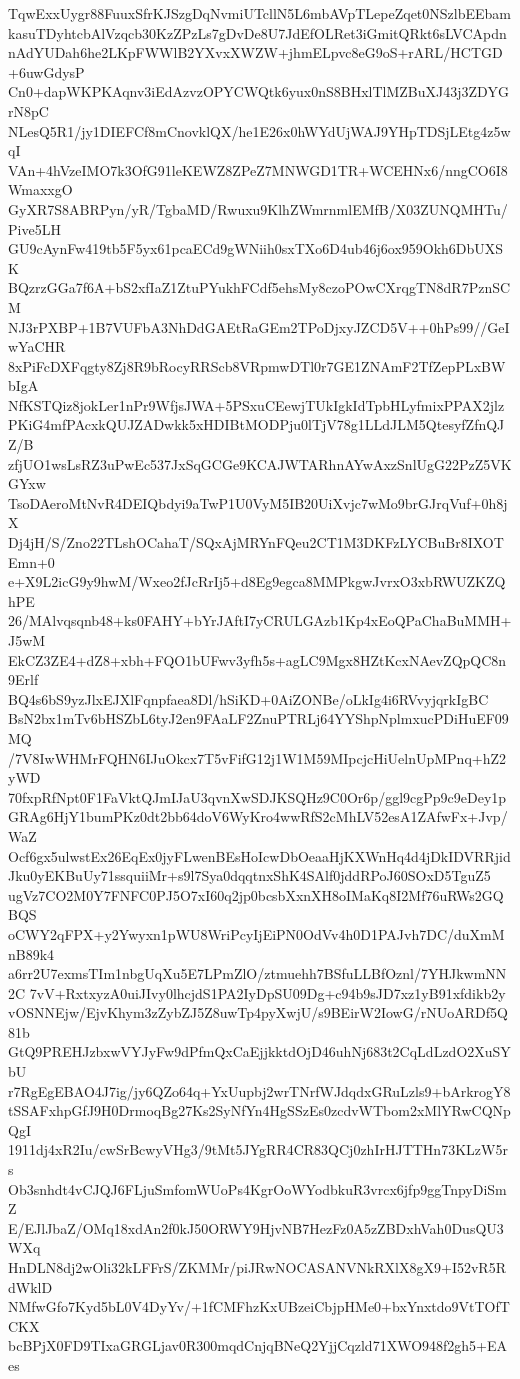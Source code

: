 TqwExxUygr88FuuxSfrKJSzgDqNvmiUTcllN5L6mbAVpTLepeZqet0NSzlbEEbam
kasuTDyhtcbAlVzqcb30KzZPzLs7gDvDe8U7JdEfOLRet3iGmitQRkt6sLVCApdn
nAdYUDah6he2LKpFWWlB2YXvxXWZW+jhmELpvc8eG9oS+rARL/HCTGD+6uwGdysP
Cn0+dapWKPKAqnv3iEdAzvzOPYCWQtk6yux0nS8BHxlTlMZBuXJ43j3ZDYGrN8pC
NLesQ5R1/jy1DIEFCf8mCnovklQX/he1E26x0hWYdUjWAJ9YHpTDSjLEtg4z5wqI
VAn+4hVzeIMO7k3OfG91leKEWZ8ZPeZ7MNWGD1TR+WCEHNx6/nngCO6I8WmaxxgO
GyXR7S8ABRPyn/yR/TgbaMD/Rwuxu9KlhZWmrnmlEMfB/X03ZUNQMHTu/Pive5LH
GU9cAynFw419tb5F5yx61pcaECd9gWNiih0sxTXo6D4ub46j6ox959Okh6DbUXSK
BQzrzGGa7f6A+bS2xfIaZ1ZtuPYukhFCdf5ehsMy8czoPOwCXrqgTN8dR7PznSCM
NJ3rPXBP+1B7VUFbA3NhDdGAEtRaGEm2TPoDjxyJZCD5V++0hPs99//GeIwYaCHR
8xPiFcDXFqgty8Zj8R9bRocyRRScb8VRpmwDTl0r7GE1ZNAmF2TfZepPLxBWbIgA
NfKSTQiz8jokLer1nPr9WfjsJWA+5PSxuCEewjTUkIgkIdTpbHLyfmixPPAX2jlz
PKiG4mfPAcxkQUJZADwkk5xHDIBtMODPju0lTjV78g1LLdJLM5QtesyfZfnQJZ/B
zfjUO1wsLsRZ3uPwEc537JxSqGCGe9KCAJWTARhnAYwAxzSnlUgG22PzZ5VKGYxw
TsoDAeroMtNvR4DEIQbdyi9aTwP1U0VyM5IB20UiXvjc7wMo9brGJrqVuf+0h8jX
Dj4jH/S/Zno22TLshOCahaT/SQxAjMRYnFQeu2CT1M3DKFzLYCBuBr8IXOTEmn+0
e+X9L2icG9y9hwM/Wxeo2fJcRrIj5+d8Eg9egca8MMPkgwJvrxO3xbRWUZKZQhPE
26/MAlvqsqnb48+ks0FAHY+bYrJAftI7yCRULGAzb1Kp4xEoQPaChaBuMMH+J5wM
EkCZ3ZE4+dZ8+xbh+FQO1bUFwv3yfh5s+agLC9Mgx8HZtKcxNAevZQpQC8n9Erlf
BQ4s6bS9yzJlxEJXlFqnpfaea8Dl/hSiKD+0AiZONBe/oLkIg4i6RVvyjqrkIgBC
BsN2bx1mTv6bHSZbL6tyJ2en9FAaLF2ZnuPTRLj64YYShpNplmxucPDiHuEF09MQ
/7V8IwWHMrFQHN6IJuOkcx7T5vFifG12j1W1M59MIpcjcHiUelnUpMPnq+hZ2yWD
70fxpRfNpt0F1FaVktQJmIJaU3qvnXwSDJKSQHz9C0Or6p/ggl9cgPp9c9eDey1p
GRAg6HjY1bumPKz0dt2bb64doV6WyKro4wwRfS2cMhLV52esA1ZAfwFx+Jvp/WaZ
Ocf6gx5ulwstEx26EqEx0jyFLwenBEsHoIcwDbOeaaHjKXWnHq4d4jDkIDVRRjid
Jku0yEKBuUy71ssquiiMr+s9l7Sya0dqqtnxShK4SAlf0jddRPoJ60SOxD5TguZ5
ugVz7CO2M0Y7FNFC0PJ5O7xI60q2jp0bcsbXxnXH8oIMaKq8I2Mf76uRWs2GQBQS
oCWY2qFPX+y2Ywyxn1pWU8WriPcyIjEiPN0OdVv4h0D1PAJvh7DC/duXmMnB89k4
a6rr2U7exmsTIm1nbgUqXu5E7LPmZlO/ztmuehh7BSfuLLBfOznl/7YHJkwmNN2C
7vV+RxtxyzA0uiJIvy0lhcjdS1PA2IyDpSU09Dg+c94b9sJD7xz1yB91xfdikb2y
vOSNNEjw/EjvKhym3zZybZJ5Z8uwTp4pyXwjU/s9BEirW2IowG/rNUoARDf5Q81b
GtQ9PREHJzbxwVYJyFw9dPfmQxCaEjjkktdOjD46uhNj683t2CqLdLzdO2XuSYbU
r7RgEgEBAO4J7ig/jy6QZo64q+YxUupbj2wrTNrfWJdqdxGRuLzls9+bArkrogY8
tSSAFxhpGfJ9H0DrmoqBg27Ks2SyNfYn4HgSSzEs0zcdvWTbom2xMlYRwCQNpQgI
1911dj4xR2Iu/cwSrBcwyVHg3/9tMt5JYgRR4CR83QCj0zhIrHJTTHn73KLzW5rs
Ob3snhdt4vCJQJ6FLjuSmfomWUoPs4KgrOoWYodbkuR3vrcx6jfp9ggTnpyDiSmZ
E/EJlJbaZ/OMq18xdAn2f0kJ50ORWY9HjvNB7HezFz0A5zZBDxhVah0DusQU3WXq
HnDLN8dj2wOli32kLFFrS/ZKMMr/piJRwNOCASANVNkRXlX8gX9+I52vR5RdWklD
NMfwGfo7Kyd5bL0V4DyYv/+1fCMFhzKxUBzeiCbjpHMe0+bxYnxtdo9VtTOfTCKX
bcBPjX0FD9TIxaGRGLjav0R300mqdCnjqBNeQ2YjjCqzld71XWO948f2gh5+EAes
